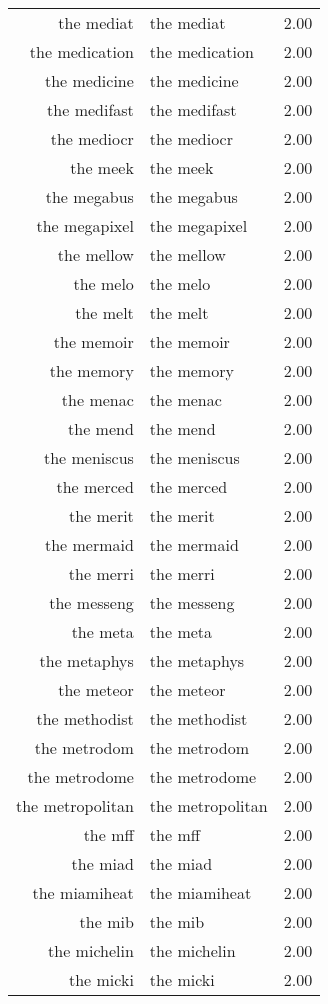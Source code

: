 \begin{table}[ht]
\begin{tabular}{rlr}
  the mediat & the mediat & 2.00 \\ 
  the medication & the medication & 2.00 \\ 
  the medicine & the medicine & 2.00 \\ 
  the medifast & the medifast & 2.00 \\ 
  the mediocr & the mediocr & 2.00 \\ 
  the meek & the meek & 2.00 \\ 
  the megabus & the megabus & 2.00 \\ 
  the megapixel & the megapixel & 2.00 \\ 
  the mellow & the mellow & 2.00 \\ 
  the melo & the melo & 2.00 \\ 
  the melt & the melt & 2.00 \\ 
  the memoir & the memoir & 2.00 \\ 
  the memory & the memory & 2.00 \\ 
  the menac & the menac & 2.00 \\ 
  the mend & the mend & 2.00 \\ 
  the meniscus & the meniscus & 2.00 \\ 
  the merced & the merced & 2.00 \\ 
  the merit & the merit & 2.00 \\ 
  the mermaid & the mermaid & 2.00 \\ 
  the merri & the merri & 2.00 \\ 
  the messeng & the messeng & 2.00 \\ 
  the meta & the meta & 2.00 \\ 
  the metaphys & the metaphys & 2.00 \\ 
  the meteor & the meteor & 2.00 \\ 
  the methodist & the methodist & 2.00 \\ 
  the metrodom & the metrodom & 2.00 \\ 
  the metrodome & the metrodome & 2.00 \\ 
  the metropolitan & the metropolitan & 2.00 \\ 
  the mff & the mff & 2.00 \\ 
  the miad & the miad & 2.00 \\ 
  the miamiheat & the miamiheat & 2.00 \\ 
  the mib & the mib & 2.00 \\ 
  the michelin & the michelin & 2.00 \\ 
  the micki & the micki & 2.00 \\ 

\end{tabular}
\end{table}
